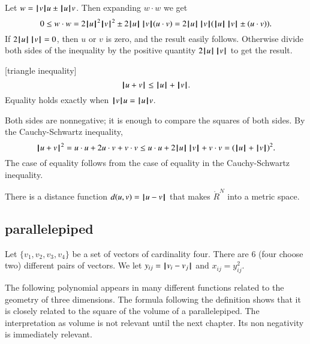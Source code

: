 \begin{proved}
   Let $w = \normo{v} u \pm \normo{u} v$.  Then expanding $w\cdot w$ we get
    $$0\le w\cdot w = 2\normo{u}^2\normo{v}^2 \pm 2\normo{u}\, \normo{v} (u\cdot v) =
    2\normo{u}\,
    \normo{v} (\normo{u}\, \normo{v} \pm (u \cdot v)).$$
    If $2\normo{u} \,\normo{v} = 0$, then $u$ or $v$ is zero, and the result
    easily follows.  Otherwise divide both sides of the inequality
    by the positive quantity $2 \normo{u} \,\normo{v}$ to get the result.
\swallowed\end{proved}

\begin{lemma}[triangle inequality]
  $$
  \normo{u + v} \le \normo{u} + \normo{v }.
  $$
Equality holds exactly when $\normo{v}u = \normo{u}v$.
\end{lemma}

\begin{proved}
Both sides are nonnegative; it is enough to compare the squares of
both sides.  By the Cauchy-Schwartz inequality,
    $$\normo{u + v}^2 = u\cdot u + 2 u\cdot v + v\cdot v \le
      u\cdot u + 2 \normo{ u}\,\normo{v} + v\cdot v = (\normo{u}+\normo{v})^2.
    $$
The case of equality follows from the case of equality in the
Cauchy-Schwartz inequality.
\swallowed\end{proved}

There is a distance function $d(u,v) = \norm{ u }{ v}$ that makes
$\ring{R}^N$ into a metric space.  






\subsection{parallelepiped}

Let $\{v_1,v_2,v_3,v_4\}$ be a set of vectors of cardinality four.
There are $6$ (four choose two) different pairs of vectors. We let
$y_{ij} = \norm{v_i}{v_j}$ and $x_{ij}=y_{ij}^2$.

The following polynomial appears in many different functions related to the geometry of three dimensions.  The formula following the definition shows that it is closely related to the square of the volume of a parallelepiped.  The interpretation as  volume is not relevant until the next chapter.  Its non negativity is immediately relevant. 

